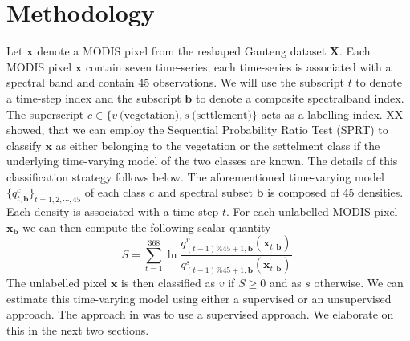 \documentclass{article}
\begin{document}
\section{Methodology}
Let $\mathbf{x}$ denote a MODIS pixel from the reshaped Gauteng dataset $\mathbf{X}$. Each MODIS pixel $\mathbf{x}$ contain seven time-series; each time-series is associated with a spectral band and contain 45 observations.
We will use the subscript $t$ to denote a time-step index and the subscript $\mathbf{b}$ to denote a composite spectralband index. The superscript $c\in\{v~\textrm{(vegetation)},s~\textrm{(settlement)}\}$ acts as a labelling index. XX showed, that we can employ the Sequential Probability Ratio Test (SPRT) to classify $\mathbf{x}$ as either belonging to the vegetation or the settelment class if 
the underlying time-varying model of the two classes are known. The details of this classification strategy follows below. The aforementioned time-varying model $\{q_{t,\mathbf{b}}^c\}_{t=1,2,\cdots,45}$ of each class $c$ and spectral subset $\mathbf{b}$ is composed of 45 densities. Each density is associated with a time-step $t$. 
For each unlabelled MODIS pixel $\mathbf{x}_{\mathbf{b}}$ we can then compute the following scalar quantity 
\begin{equation}
S = \sum_{t=1}^{368} \ln \frac{q_{(t-1)\%45+1,\mathbf{b}}^v(\mathbf{x}_{t,\mathbf{b}})}{q_{(t-1)\%45+1,\mathbf{b}}^s(\mathbf{x}_{t,\mathbf{b}})}. 
\end{equation}
The unlabelled pixel $\mathbf{x}$ is then classified as $v$ if $S\geq 0$ and as $s$ otherwise. We can estimate this time-varying model using either a supervised or an unsupervised 
approach. The approach in was to use a supervised approach. We elaborate on this in the next two sections.
\end{document}
